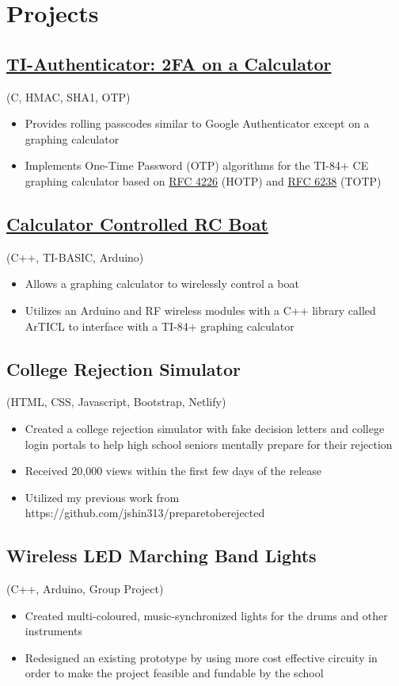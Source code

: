 \documentclass{article}
\begin{document}
\section{Projects}
\subsection{\href{https://github.com/jshin313/ti-authenticator}{TI-Authenticator: 2FA on a Calculator}} (C, HMAC, SHA1, OTP)
\begin{itemize}
    \item Provides rolling passcodes similar to Google Authenticator except on a graphing calculator
    \item Implements One-Time Password (OTP) algorithms for the TI-84+ CE graphing calculator based on \href{https://tools.ietf.org/html/rfc4226}{RFC 4226} (HOTP) and \href{https://tools.ietf.org/html/rfc6238}{RFC 6238} (TOTP)
\end{itemize}

\subsection{\href{https://github.com/jshin313/CalcControlledBoat}{Calculator Controlled RC Boat}} (C++, TI-BASIC, Arduino)
\begin{itemize}
    \item Allows a graphing calculator to wirelessly control a boat
    \item Utilizes an Arduino and RF wireless modules with a C++ library called ArTICL to interface with a TI-84+ graphing calculator
\end{itemize}

\subsection{College Rejection Simulator} (HTML, CSS, Javascript, Bootstrap, Netlify)
\begin{itemize}
    \item Created a college rejection simulator with fake decision letters and college login portals to help high school seniors mentally prepare for their rejection
    \item Received 20,000 views within the first few days of the release
    \item Utilized my previous work from https://github.com/jshin313/preparetoberejected
\end{itemize}

\subsection{Wireless LED Marching Band Lights} (C++, Arduino, Group Project)
\begin{itemize}
    \item Created multi-coloured, music-synchronized lights for the drums and other instruments
    \item Redesigned an existing prototype by using more cost effective circuity in order to make the project feasible and fundable by the school
\end{itemize}
\end{document}
